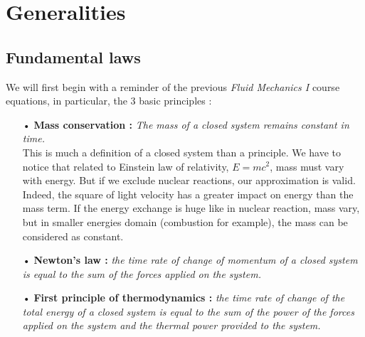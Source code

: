 
\chapter{Generalities}
\section{Fundamental laws}
	We will first begin with a reminder of the previous \textit{Fluid Mechanics I} course equations, in particular, the 3 basic principles : \\
	
	\begin{itemize}
		\item[•] \textbf{Mass conservation :} \textit{The mass of a closed system remains constant in time.}\\
		This is much a definition of a closed system than a principle. We have to notice that related to Einstein law of relativity, $E = mc^2$, mass must vary with energy. But if we exclude nuclear reactions, our approximation is valid. Indeed, the square of light velocity has a greater impact on energy than the mass term. If the energy exchange is huge like in nuclear reaction, mass vary, but in smaller energies domain (combustion for example), the mass can be considered as constant. \\
		
		\item[•] \textbf{Newton's law :} \textit{the time rate of change of momentum of a closed system is equal to the sum of the forces applied on the system.} \\
		
		\item[•] \textbf{First principle of thermodynamics :} \textit{the time rate of change of the total energy of a closed system is equal to the sum of the power of the forces applied on the system and the thermal power provided to the system.}
	\end{itemize}		